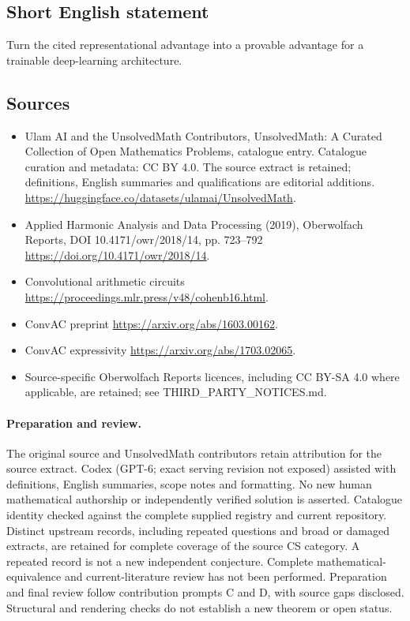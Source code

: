 \documentclass[11pt]{article}
\begin{document}
\subsection{Short English statement}
Turn the cited representational advantage into a provable advantage for a trainable deep-learning architecture.
\subsection{Sources}
\begin{itemize}
\item[\hypertarget{source:statement:1}{S1}] Ulam AI and the UnsolvedMath Contributors, UnsolvedMath: A Curated Collection of Open Mathematics Problems, catalogue entry. Catalogue curation and metadata: CC BY 4.0. The source extract is retained; definitions, English summaries and qualifications are editorial additions.
\url{https://huggingface.co/datasets/ulamai/UnsolvedMath}.
\item[\hypertarget{source:statement:2}{S2}] Applied Harmonic Analysis and Data Processing (2019), Oberwolfach Reports, DOI 10.4171/owr/2018/14, pp. 723--792
\url{https://doi.org/10.4171/owr/2018/14}.
\item[\hypertarget{source:statement:3}{S3}] Convolutional arithmetic circuits
\url{https://proceedings.mlr.press/v48/cohenb16.html}.
\item[\hypertarget{source:statement:4}{S4}] ConvAC preprint
\url{https://arxiv.org/abs/1603.00162}.
\item[\hypertarget{source:statement:5}{S5}] ConvAC expressivity
\url{https://arxiv.org/abs/1703.02065}.
\item Source-specific Oberwolfach Reports licences, including CC BY-SA 4.0 where applicable, are retained; see THIRD\_PARTY\_NOTICES.md.
\end{itemize}
\paragraph{Preparation and review.}
The original source and UnsolvedMath contributors retain attribution for the source extract. Codex (GPT-6; exact serving revision not exposed) assisted with definitions, English summaries, scope notes and formatting. No new human mathematical authorship or independently verified solution is asserted. Catalogue identity checked against the complete supplied registry and current repository. Distinct upstream records, including repeated questions and broad or damaged extracts, are retained for complete coverage of the source CS category. A repeated record is not a new independent conjecture. Complete mathematical-equivalence and current-literature review has not been performed. Preparation and final review follow contribution prompts C and D, with source gaps disclosed. Structural and rendering checks do not establish a new theorem or open status.
\label{end:statement}
\end{document}
